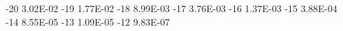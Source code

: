 -20	3.02E-02
-19	1.77E-02
-18	8.99E-03
-17	3.76E-03
-16	1.37E-03
-15	3.88E-04
-14	8.55E-05
-13	1.09E-05
-12	9.83E-07
